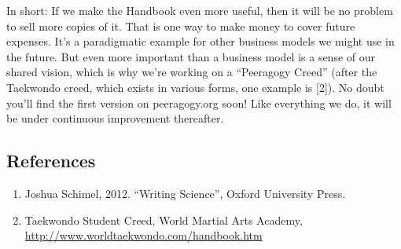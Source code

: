 In short: If we make the Handbook even more useful, then it will be no
problem to sell more copies of it. That is one way to make money to
cover future expenses. It's a paradigmatic example for other business
models we might use in the future. But even more important than
a business model is a sense of our shared vision, which is why
we're working on a ``Peeragogy Creed'' (after the Taekwondo creed, which
exists in various forms, one example is {[}2{]}).  No doubt you'll
find the first version on peeragogy.org soon!  Like everything we do,
it will be under continuous improvement thereafter.

\subsection*{References}\label{references}

\begin{enumerate}
\def\labelenumi{\arabic{enumi}.}
\item
  Joshua Schimel, 2012. ``Writing Science'', Oxford University Press.
\item
  Taekwondo Student Creed, World Martial Arts Academy, \url{http://www.worldtaekwondo.com/handbook.htm}
\end{enumerate}
